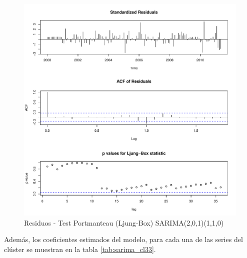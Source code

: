 \documentclass[12pt,oneside]{book}\usepackage[]{graphicx}\usepackage[]{color}
\makeatletter
\def\maxwidth{ %
  \ifdim\Gin@nat@width>\linewidth
    \linewidth
  \else
    \Gin@nat@width
  \fi
}
\newenvironment{knitrout}{}{} %
\theoremstyle{definition} %
\makeatother
\begin{document}
\begin{knitrout}
\color{fgcolor}\begin{figure}[h]

{\centering \includegraphics[width=\maxwidth]{figure/unnamed-chunk-84-1} 

}

\caption[Residuos - Test Portmanteau (Ljung-Box) SARIMA(2,0,1)(1,1,0)]{Residuos - Test Portmanteau (Ljung-Box) SARIMA(2,0,1)(1,1,0)}\label{fig:unnamed-chunk-84}
\end{figure}


\end{knitrout}


Además, los coeficientes estimados del modelo, para cada una de las series del clúster se muestran en la tabla \ref{tab:sarima_cl33}.
\end{document}
